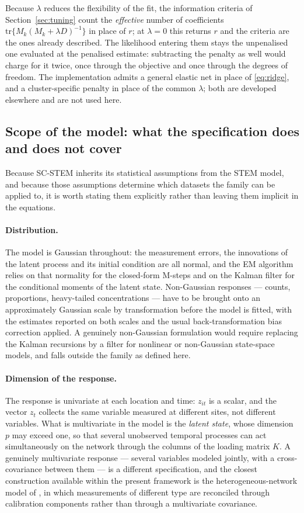 Because $\lambda$ reduces the flexibility of the fit, the information criteria of Section~\ref{sec:tuning} count the \emph{effective} number of coefficients $\mathrm{tr}\{M_k(M_k + \lambda D)^{-1}\}$ in place of $r$; at $\lambda = 0$ this returns $r$ and the criteria are the ones already described. The likelihood entering them stays the unpenalised one evaluated at the penalised estimate: subtracting the penalty as well would charge for it twice, once through the objective and once through the degrees of freedom. The implementation admits a general elastic net in place of \eqref{eq:ridge}, and a cluster-specific penalty in place of the common $\lambda$; both are developed elsewhere and are not used here.

\subsection{Scope of the model: what the specification does and does not cover}\label{sec2:scope}

Because SC-STEM inherits its statistical assumptions from the STEM model, and because those assumptions determine which datasets the family can be applied to, it is worth stating them explicitly rather than leaving them implicit in the equations.

\paragraph{Distribution.} The model is Gaussian throughout: the measurement errors, the innovations of the latent process and its initial condition are all normal, and the EM algorithm relies on that normality for the closed-form M-steps and on the Kalman filter for the conditional moments of the latent state. Non-Gaussian responses --- counts, proportions, heavy-tailed concentrations --- have to be brought onto an approximately Gaussian scale by transformation before the model is fitted, with the estimates reported on both scales and the usual back-transformation bias correction applied. A genuinely non-Gaussian formulation would require replacing the Kalman recursions by a filter for nonlinear or non-Gaussian state-space models, and falls outside the family as defined here.

\paragraph{Dimension of the response.} The response is univariate at each location and time: $z_{it}$ is a scalar, and the vector $z_t$ collects the same variable measured at different sites, not different variables. What is multivariate in the model is the \emph{latent state}, whose dimension $p$ may exceed one, so that several unobserved temporal processes can act simultaneously on the network through the columns of the loading matrix $K$. A genuinely multivariate response --- several variables modeled jointly, with a cross-covariance between them --- is a different specification, and the closest construction available within the present framework is the heterogeneous-network model of \citet{FassoCamelettiNicolis2007}, in which measurements of different type are reconciled through calibration components rather than through a multivariate covariance.

